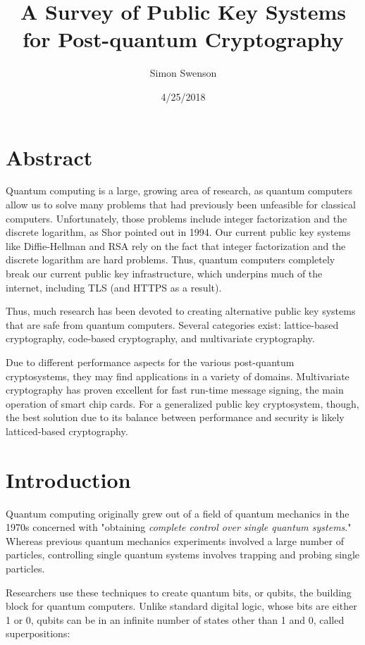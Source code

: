 \documentclass{article}
\title{A Survey of Public Key Systems for Post-quantum Cryptography}
\date{4/25/2018}
\author{Simon Swenson}
\begin{document}
\maketitle
{}
\newpage
{}

\section{Abstract}

Quantum computing is a large, growing area of research, as quantum computers allow us to solve many problems that had previously been unfeasible for classical computers. Unfortunately, those problems include integer factorization and the discrete logarithm, as Shor pointed out in 1994.\cite{shor95} Our current public key systems like Diffie-Hellman and RSA rely on the fact that integer factorization and the discrete logarithm are hard problems. Thus, quantum computers completely break our current public key infrastructure, which underpins much of the internet, including TLS (and HTTPS as a result).

Thus, much research has been devoted to creating alternative public key systems that are safe from quantum computers. Several categories exist: lattice-based cryptography, code-based cryptography, and multivariate cryptography.

Due to different performance aspects for the various post-quantum cryptosystems, they may find applications in a variety of domains. Multivariate cryptography has proven excellent for fast run-time message signing, the main operation of smart chip cards. For a generalized public key cryptosystem, though, the best solution due to its balance between performance and security is likely latticed-based cryptography.

\section{Introduction}

Quantum computing originally grew out of a field of quantum mechanics in the 1970s concerned with "obtaining \textit{complete control over single quantum systems}." Whereas previous quantum mechanics experiments involved a large number of particles, controlling single quantum systems involves trapping and probing single particles.\cite{nielsen12}

Researchers use these techniques to create quantum bits, or qubits, the building block for quantum computers. Unlike standard digital logic, whose bits are either 1 or 0, qubits can be in an infinite number of states other than 1 and 0, called superpositions:
\end{document}
